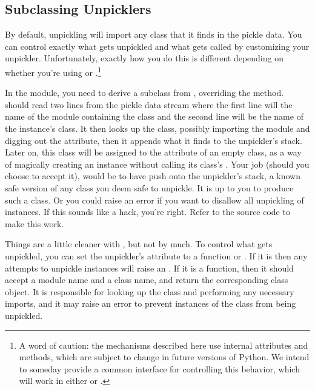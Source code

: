
\subsection{Subclassing Unpicklers \label{pickle-sub}}

By default, unpickling will import any class that it finds in the
pickle data.  You can control exactly what gets unpickled and what
gets called by customizing your unpickler.  Unfortunately, exactly how
you do this is different depending on whether you're using
 or .\footnote{A word of caution: the
mechanisms described here use internal attributes and methods, which
are subject to change in future versions of Python.  We intend to
someday provide a common interface for controlling this behavior,
which will work in either  or .}

In the  module, you need to derive a subclass from
, overriding the 
method.   should read two lines from the pickle
data stream where the first line will the name of the module
containing the class and the second line will be the name of the
instance's class.  It then looks up the class, possibly importing the
module and digging out the attribute, then it appends what it finds to
the unpickler's stack.  Later on, this class will be assigned to the
 attribute of an empty class, as a way of magically
creating an instance without calling its class's .
Your job (should you choose to accept it), would be to have
 push onto the unpickler's stack, a known safe
version of any class you deem safe to unpickle.  It is up to you to
produce such a class.  Or you could raise an error if you want to
disallow all unpickling of instances.  If this sounds like a hack,
you're right.  Refer to the source code to make this work.

Things are a little cleaner with , but not by much.
To control what gets unpickled, you can set the unpickler's
 attribute to a function or .  If it is
 then any attempts to unpickle instances will raise an
.  If it is a function,
then it should accept a module name and a class name, and return the
corresponding class object.  It is responsible for looking up the
class and performing any necessary imports, and it may raise an
error to prevent instances of the class from being unpickled.

